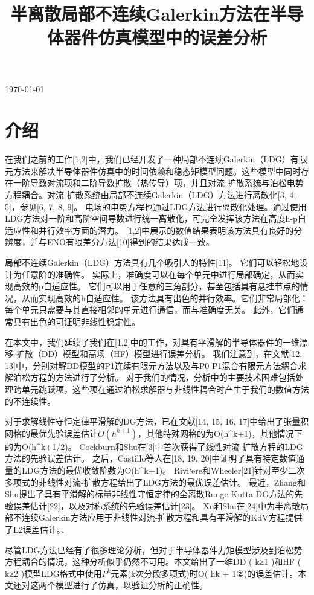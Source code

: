 \documentclass[lang=cn,newtx,10pt,scheme=chinese]{elegantbook}
\title{半离散局部不连续Galerkin方法在半导体器件仿真模型中的误差分析}
\begin{document}
\maketitle

\frontmatter

\tableofcontents

\mainmatter

\today
\section{介绍}
在我们之前的工作[1,2]中，我们已经开发了一种局部不连续Galerkin（LDG）有限元方法来解决半导体器件仿真中的时间依赖和稳态矩模型问题。这些模型中同时存在一阶导数对流项和二阶导数扩散（热传导）项，并且对流-扩散系统与泊松电势方程耦合。对流-扩散系统由局部不连续Galerkin（LDG）方法进行离散化[3, 4, 5]，参见[6, 7, 8, 9]。
电场的电势方程也通过LDG方法进行离散化处理。通过使用LDG方法对一阶和高阶空间导数进行统一离散化，可完全发挥该方法在高度h-p自适应性和并行效率方面的潜力。
[1,2]中展示的数值结果表明该方法具有良好的分辨度，并与ENO有限差分方法[10]得到的结果达成一致。

局部不连续Galerkin（LDG）方法具有几个吸引人的特性[11]。
它们可以轻松地设计为任意阶的准确性。
实际上，准确度可以在每个单元中进行局部确定，从而实现高效的p自适应性。
它们可以用于任意的三角剖分，甚至包括具有悬挂节点的情况，从而实现高效的h自适应性。
该方法具有出色的并行效率。它们非常局部化：每个单元只需要与其直接相邻的单元进行通信，而与准确度无关。
此外，它们通常具有出色的可证明非线性稳定性。

在本文中，我们延续了我们在[1,2]中的工作，对具有平滑解的半导体器件的一维漂移-扩散（DD）模型和高场（HF）模型进行误差分析。
我们注意到，在文献[12, 13]中，分别对解DD模型的P1连续有限元方法以及与P0-P1混合有限元方法耦合求解泊松方程的方法进行了分析。
对于我们的情况，分析中的主要技术困难包括处理跨单元跳跃项，这些项在通过泊松求解器与非线性耦合时产生于我们的数值方法的不连续性。

对于求解线性守恒定律平滑解的DG方法，已在文献[14, 15, 16, 17]中给出了张量积网格的最优先验误差估计$O(h^{k+1})$，其他特殊网格的为O(h^{k+1})，其他情况下的为O(h^{k+1/2})。
Cockburn和Shu在[3]中首次获得了线性对流-扩散方程的LDG方法的先验误差估计。
之后，Castillo等人在[18, 19, 20]中证明了具有特定数值通量的LDG方法的最优收敛阶数为O(h^{k+1})。
Rivi`ere和Wheeler[21]针对至少二次多项式的非线性对流-扩散方程给出了LDG方法的最优误差估计。
最近，Zhang和Shu提出了具有平滑解的标量非线性守恒定律的全离散Runge-Kutta DG方法的先验误差估计[22]，以及对称系统的先验误差估计[23]。
Xu和Shu在[24]中为半离散局部不连续Galerkin方法应用于非线性对流-扩散方程和具有平滑解的KdV方程提供了L2误差估计。、

尽管LDG方法已经有了很多理论分析，但对于半导体器件力矩模型涉及到泊松势方程耦合的情况，这种分析似乎仍然不可用。本文给出了一维DD ( k≥1 )和HF ( k≥2 )模型LDG格式中使用$P^k$元素(k次分段多项式)时O( hk + 1②)的误差估计。本文还对这两个模型进行了仿真，以验证分析的正确性。
\end{document}
